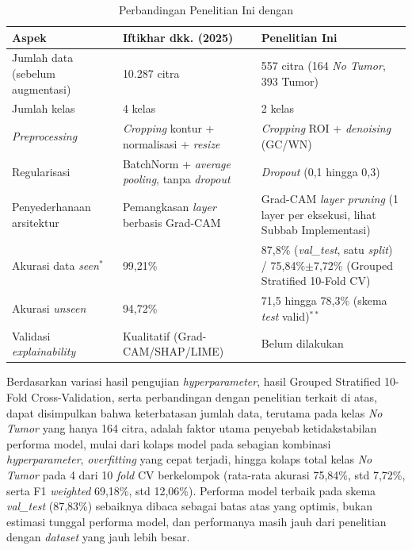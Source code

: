 \begin{table}[htbp]
	\centering
	\caption{Perbandingan Penelitian Ini dengan \autocite{iftikhar2025explainable}}
	\label{tab:iftikhar_compare}
	\begin{tabular}{|p{3.2cm}|p{4.8cm}|p{4.8cm}|}
		\hline
		\textbf{Aspek} & \textbf{Iftikhar dkk. (2025)} & \textbf{Penelitian Ini} \\ \hline
		Jumlah data (sebelum augmentasi) & 10.287 citra & 557 citra (164 \textit{No Tumor}, 393 Tumor) \\ \hline
		Jumlah kelas & 4 kelas & 2 kelas \\ \hline
		\textit{Preprocessing} & \textit{Cropping} kontur + normalisasi + \textit{resize} & \textit{Cropping} ROI + \textit{denoising} (GC/WN) \\ \hline
		Regularisasi & BatchNorm + \textit{average pooling}, tanpa \textit{dropout} & \textit{Dropout} (0,1 hingga 0,3) \\ \hline
		Penyederhanaan arsitektur & Pemangkasan \textit{layer} berbasis Grad-CAM & Grad-CAM \textit{layer pruning} (1 layer per eksekusi, lihat Subbab Implementasi) \\ \hline
		Akurasi data \textit{seen}$^{*}$ & 99,21\% & 87,8\% (\textit{val\_test}, satu \textit{split}) / 75,84\%$\pm$7,72\% (Grouped Stratified 10-Fold CV) \\ \hline
		Akurasi \textit{unseen} & 94,72\% & 71,5 hingga 78,3\% (skema \textit{test} valid)$^{**}$ \\ \hline
		Validasi \textit{explainability} & Kualitatif (Grad-CAM/SHAP/LIME) & Belum dilakukan \\ \hline
	\end{tabular}
\end{table}

Berdasarkan variasi hasil pengujian \textit{hyperparameter}, hasil Grouped Stratified 10-Fold Cross-Validation, serta perbandingan dengan penelitian terkait di atas, dapat disimpulkan bahwa keterbatasan jumlah data, terutama pada kelas \textit{No Tumor} yang hanya 164 citra, adalah faktor utama penyebab ketidakstabilan performa model, mulai dari kolaps model pada sebagian kombinasi \textit{hyperparameter}, \textit{overfitting} yang cepat terjadi, hingga kolaps total kelas \textit{No Tumor} pada 4 dari 10 \textit{fold} CV berkelompok (rata-rata akurasi 75,84\%, std 7,72\%, serta F1 \textit{weighted} 69,18\%, std 12,06\%). Performa model terbaik pada skema \textit{val\_test} (87,83\%) sebaiknya dibaca sebagai batas atas yang optimis, bukan estimasi tunggal performa model, dan performanya masih jauh dari penelitian dengan \textit{dataset} yang jauh lebih besar.


